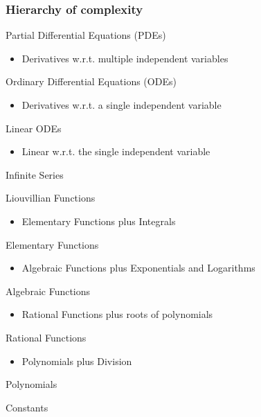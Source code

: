 \documentclass{beamer}
\begin{document}
\begin{frame}
\frametitle{Hierarchy of complexity}

Partial Differential Equations (PDEs)
\begin{itemize}
\item Derivatives w.r.t. multiple independent variables
\end{itemize}

Ordinary Differential Equations (ODEs)
\begin{itemize}
\item Derivatives w.r.t. a single independent variable
\end{itemize}

Linear ODEs
\begin{itemize}
\item Linear w.r.t. the single independent variable
\end{itemize}

Infinite Series

Liouvillian Functions
\begin{itemize}
\item Elementary Functions plus Integrals
\end{itemize}

Elementary Functions
\begin{itemize}
\item Algebraic Functions plus Exponentials and Logarithms
\end{itemize}

Algebraic Functions
\begin{itemize}
\item Rational Functions plus roots of polynomials
\end{itemize}

Rational Functions
\begin{itemize}
\item Polynomials plus Division
\end{itemize}

Polynomials

Constants
\end{frame}

\end{document}
